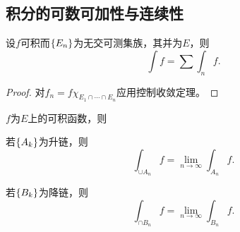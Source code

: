 \documentclass{ctexrep}
\begin{document}
  \subsection{积分的可数可加性与连续性}
  \begin{theorem}[积分的可数可加性]
    设$f$可积而$\left\{E_n\right\}$为无交可测集族，其并为$E$，则
    \[ \int f = \sum \int_n f. \]
  \end{theorem}
  \begin{proof}
    对$f_n = f \chi_{E_1\cap\cdots\cap E_n}$应用控制收敛定理。
  \end{proof}
  \begin{theorem}[积分的连续性]
    $f$为$E$上的可积函数，则
    \begin{aenum}
      \item 若$\left\{A_k\right\}$为升链，则
      \[ \int_{\cup A_n} f = \lim_{n\to\infty} \int_{A_n} f. \]
      \item 若$\left\{B_k\right\}$为降链，则
      \[ \int_{\cap B_n} f = \lim_{n\to\infty} \int_{B_n} f. \]
    \end{aenum}
  \end{theorem}
\end{document}
